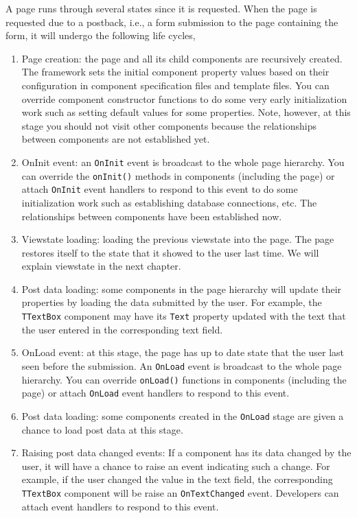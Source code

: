 \documentclass{book}
\begin{document}
A page runs through several states since it is requested. When the
page is requested due to a postback, i.e., a form submission to
the page containing the form, it will undergo the following life
cycles,
\begin{enumerate}
\item Page creation: the page and all its child components are
recursively created. The framework sets the initial component
property values based on their configuration in component
specification files and template files. You can override component
constructor functions to do some very early initialization work
such as setting default values for some properties. Note, however,
at this stage you should not visit other components because the
relationships between components are not established yet.

\item OnInit event: an \verb|OnInit| event is broadcast to the
whole page hierarchy. You can override the \verb|onInit()| methods
in components (including the page) or attach \verb|OnInit| event
handlers to respond to this event to do some initialization work
such as establishing database connections, etc. The relationships
between components have been established now.

\item Viewstate loading: loading the previous viewstate into the
page. The page restores itself to the state that it showed to the
user last time. We will explain viewstate in the next chapter.

\item Post data loading: some components in the page hierarchy
will update their properties by loading the data submitted by the
user. For example, the \verb|TTextBox| component may have its
\verb|Text| property updated with the text that the user entered
in the corresponding text field.

\item OnLoad event: at this stage, the page has up to date state
that the user last seen before the submission. An \verb|OnLoad|
event is broadcast to the whole page hierarchy. You can override
\verb|onLoad()| functions in components (including the page) or
attach \verb|OnLoad| event handlers to respond to this event.

\item Post data loading: some components created in the
\verb|OnLoad| stage are given a chance to load post data at this
stage.

\item Raising post data changed events: If a component has its
data changed by the user, it will have a chance to raise an event
indicating such a change. For example, if the user changed the
value in the text field, the corresponding \verb|TTextBox|
component will be raise an \verb|OnTextChanged| event. Developers
can attach event handlers to respond to this event.


\end{enumerate}
\end{document}
